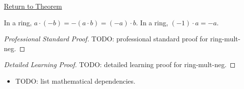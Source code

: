 \newpage
{}
\label{prf:ring-mult-neg}

\begin{remark*}[Return]
\hyperref[prop:ring-mult-neg]{Return to Theorem}
\end{remark*}

\begin{proposition*}
In a ring, $a\cdot(-b)=-(a\cdot b)=(-a)\cdot b$. In a ring,
$(-1)\cdot a=-a$.
\end{proposition*}

\begin{proof}[Professional Standard Proof]
\LRAProofBodyStart
TODO: professional standard proof for ring-mult-neg.
\end{proof}

\begin{proof}[Detailed Learning Proof]
\LRAProofBodyStart
TODO: detailed learning proof for ring-mult-neg.
\end{proof}

\begin{remark*}
\end{remark*}

\begin{dependencies}
\begin{itemize}
  \item TODO: list mathematical dependencies.
\end{itemize}
\end{dependencies}

\clearpage
